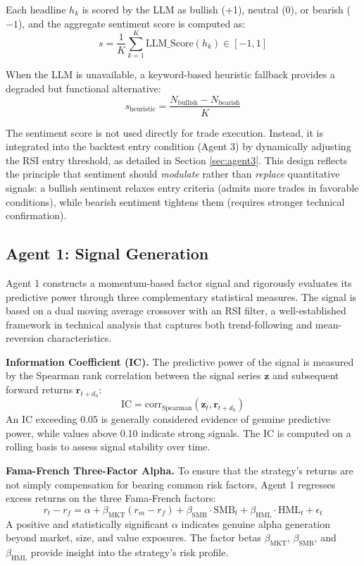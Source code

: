 \documentclass[conference]{IEEEtran}
\begin{document}
Each headline $h_k$ is scored by the LLM as bullish (+1), neutral (0), or bearish ($-1$), and the aggregate sentiment score is computed as:
\begin{equation}
    s = \frac{1}{K} \sum_{k=1}^{K} \text{LLM\_Score}(h_k) \in [-1, 1]
\end{equation}

When the LLM is unavailable, a keyword-based heuristic fallback provides a degraded but functional alternative:
\begin{equation}
    s_{\text{heuristic}} = \frac{N_{\text{bullish}} - N_{\text{bearish}}}{K}
\end{equation}

The sentiment score is not used directly for trade execution. Instead, it is integrated into the backtest entry condition (Agent 3) by dynamically adjusting the RSI entry threshold, as detailed in Section \ref{sec:agent3}. This design reflects the principle that sentiment should \textit{modulate} rather than \textit{replace} quantitative signals: a bullish sentiment relaxes entry criteria (admits more trades in favorable conditions), while bearish sentiment tightens them (requires stronger technical confirmation).

\subsection{Agent 1: Signal Generation}

Agent 1 constructs a momentum-based factor signal and rigorously evaluates its predictive power through three complementary statistical measures. The signal is based on a dual moving average crossover with an RSI filter, a well-established framework in technical analysis that captures both trend-following and mean-reversion characteristics.

\textbf{Information Coefficient (IC).} The predictive power of the signal is measured by the Spearman rank correlation between the signal series $\mathbf{z}$ and subsequent forward returns $\mathbf{r}_{t+d_h}$:
\begin{equation}
    \text{IC} = \text{corr}_{\text{Spearman}}(\mathbf{z}_t, \mathbf{r}_{t+d_h})
\end{equation}
An IC exceeding 0.05 is generally considered evidence of genuine predictive power, while values above 0.10 indicate strong signals. The IC is computed on a rolling basis to assess signal stability over time.

\textbf{Fama-French Three-Factor Alpha.} To ensure that the strategy's returns are not simply compensation for bearing common risk factors, Agent 1 regresses excess returns on the three Fama-French factors:
\begin{equation}
    r_t - r_f = \alpha + \beta_{\text{MKT}}(r_m - r_f) + \beta_{\text{SMB}} \cdot \text{SMB}_t + \beta_{\text{HML}} \cdot \text{HML}_t + \epsilon_t
    \label{eq:ff3}
\end{equation}
A positive and statistically significant $\alpha$ indicates genuine alpha generation beyond market, size, and value exposures. The factor betas $\beta_{\text{MKT}}$, $\beta_{\text{SMB}}$, and $\beta_{\text{HML}}$ provide insight into the strategy's risk profile.
\end{document}

